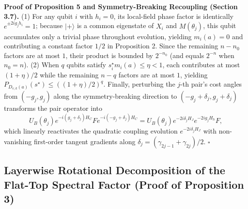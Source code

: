 \documentclass{article}
\theoremstyle{plain}
\theoremstyle{definition}
\begin{document}
\textbf{Proof of Proposition 5 and Symmetry-Breaking Recoupling (Section 3.7).} (1) For any qubit $i$ with $h_i=0$, its local-field phase factor is identically $e^{\pm 2ig_j h_i}=1$; because $|+\rangle$ is a common eigenstate of $X_i$ and $M(\theta_j)$, this qubit accumulates only a trivial phase throughout evolution, yielding $m_i(a)=0$ and contributing a constant factor $1/2$ in Proposition 2. Since the remaining $n-n_0$ factors are at most $1$, their product is bounded by $2^{-n_0}$ (and equals $2^{-n}$ when $n_0=n$). (2) When $q$ qubits satisfy $s_i^\star m_i(a)\le\eta<1$, each contributes at most $(1+\eta)/2$ while the remaining $n-q$ factors are at most $1$, yielding $P_{D_{v,k}(a)}(s^\star)\le((1+\eta)/2)^q$. Finally, perturbing the $j$-th pair's cost angles from $(-g_j, g_j)$ along the symmetry-breaking direction to $(-g_j+\delta_j, g_j+\delta_j)$ transforms the pair operator into
\[
U_B(\theta_j)e^{-i(g_j+\delta_j)H_C}Fe^{-i(-g_j+\delta_j)H_C}
=U_B(\theta_j)e^{-2i\delta_j H_J}e^{-2ig_j H_h}F,
\]
which linearly reactivates the quadratic coupling evolution $e^{-2i\delta_j H_J}$ with non-vanishing first-order tangent gradients along $\delta_j=(\gamma_{2j-1}+\gamma_{2j})/2$. \hfill$\square$

\subsection{Layerwise Rotational Decomposition of the Flat-Top Spectral Factor (Proof of Proposition 3)}\label{subsec:a_2}
\end{document}
